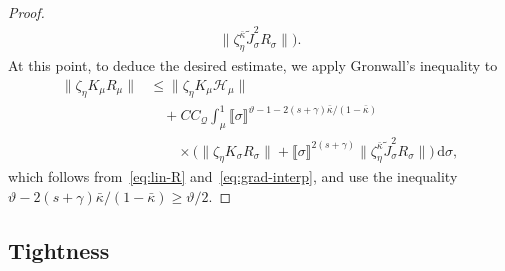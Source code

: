 \documentclass{article}
\numberwithin{equation}{section}
\newcommand{\mathd}{\mathrm{d}}
\theoremstyle{plain}
\theoremstyle{definition}
\begin{document}
\begin{proof}
\begin{equation}
\begin{aligned}
      \| \zeta_{\eta}^{\bar{\kappa}}
      \tilde{J}_{\sigma}^2 R_{\sigma} \|\bigr) .
    \end{aligned}
    \label{eq:grad-interp}
  \end{equation}
  At this point, to deduce the desired estimate, we apply Gronwall's
  inequality to
  \begin{align*}
    \| \zeta_{\eta} K_{\mu} R_{\mu} \|
    &\leqslant \| \zeta_{\eta} K_{\mu} \mathcal{H}_{\mu} \|\\
    &\quad + C C_{\mathcal{Q}} \int_{\mu}^1
    \llbracket \sigma \rrbracket^{
    \vartheta - 1 - 2 (s + \gamma)\bar{\kappa} / (1 - \bar{\kappa})}\\
    &\qquad \times
    \bigl(\| \zeta_{\eta} K_{\sigma} R_{\sigma} \|
    + \llbracket \sigma \rrbracket^{2 (s + \gamma)}
    \| \zeta_{\eta}^{\bar{\kappa}}
    \tilde{J}_{\sigma}^2 R_{\sigma} \|\bigr)\,\mathd \sigma,
  \end{align*}
  which follows from~\eqref{eq:lin-R} and~\eqref{eq:grad-interp}, and use the
  inequality $\vartheta - 2 (s + \gamma) \bar{\kappa} / (1 - \bar{\kappa})
  \geqslant \vartheta / 2$.
\end{proof}

\subsection{Tightness}\label{sec:tightness}
\end{document}
